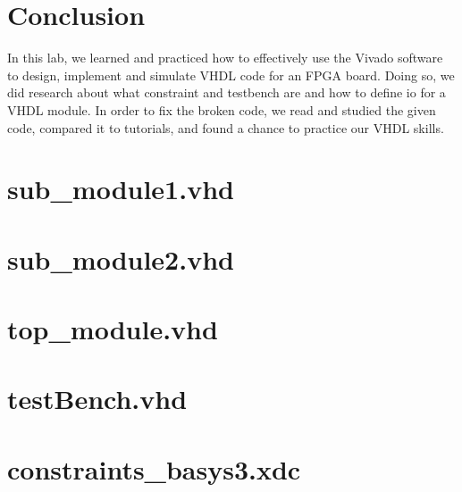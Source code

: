 \documentclass[a4paper, 12pt]{article}
\begin{document}
\section{Conclusion}
In this lab, we learned and practiced how to effectively use the Vivado software to design, implement and simulate VHDL code for an FPGA board.
Doing so, we did research about what constraint and testbench are and how to define io for a VHDL module.
In order to fix the broken code, we read and studied the given code, compared it to tutorials, and found a chance to practice our VHDL skills.

\appendix

\section{sub\_module1.vhd}


\section{sub\_module2.vhd}


\section{top\_module.vhd}


\section{testBench.vhd}


\section{constraints\_basys3.xdc}

\end{document}
